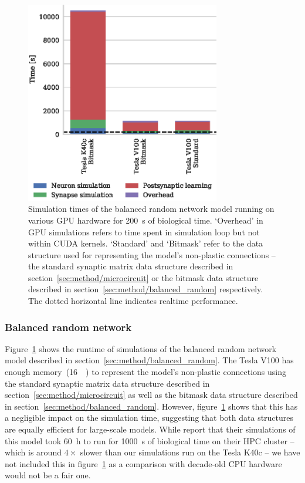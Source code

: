 \documentclass[utf8]{frontiersSCNS} %
\begin{document}
\begin{figure}
    \begin{center}
        \includegraphics[width=85mm]{figures/stdp_performance}
    \end{center}
    \caption{Simulation times of the balanced random network model running on various GPU hardware for \SI{200}{\second} of biological time.
    `Overhead' in GPU simulations refers to time spent in simulation loop but not within CUDA kernels.
    `Standard' and `Bitmask' refer to the data structure used for representing the model's non-plastic connections -- the standard synaptic matrix data structure described in section~\ref{sec:method/microcircuit} or the bitmask data structure described in section~\ref{sec:method/balanced_random} respectively.
    The dotted horizontal line indicates realtime performance.}
    \label{fig:stdp_performance}
\end{figure}

\subsubsection{Balanced random network}
Figure~\ref{fig:stdp_performance} shows the runtime of simulations of the balanced random network model described in section~\ref{sec:method/balanced_random}.
The Tesla V100 has enough memory~(\SI{16}{\giga\byte}) to represent the model's non-plastic connections using the standard synaptic matrix data structure described in section~\ref{sec:method/microcircuit} as well as the bitmask data structure described in section~\ref{sec:method/balanced_random}.
However, figure~\ref{fig:stdp_performance} shows that this has a negligible impact on the simulation time, suggesting that both data structures are equally efficient for large-scale models.
While \citet{Morrison2007} report that their simulations of this model took \SI{60}{\hour} to run for \SI{1000}{\second} of biological time on their HPC cluster -- which is around $4\times$ slower than our simulations run on the Tesla K40c -- we have not included this in figure~\ref{fig:stdp_performance} as a comparison with decade-old CPU hardware would not be a fair one.
\end{document}

